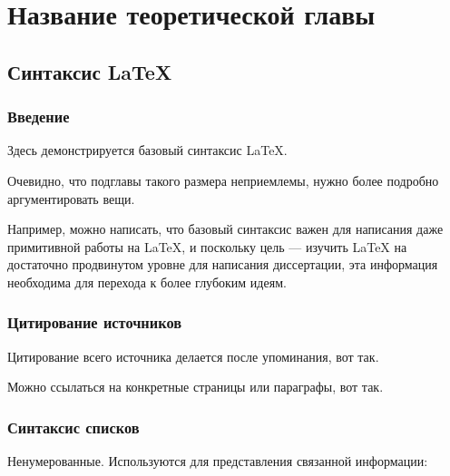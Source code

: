 \documentclass[a4paper,12pt]{report}
\begin{document}
\chapter{Название теоретической главы}\label{intro_chapter_title}

\section{Синтаксис \LaTeX{}}

\subsection{Введение}

Здесь демонстрируется базовый синтаксис \LaTeX{}.

Очевидно, что подглавы такого размера неприемлемы,
нужно более подробно аргументировать вещи.

Например, можно написать, что базовый синтаксис важен
для написания даже примитивной работы на \LaTeX{}, и поскольку
цель — изучить \LaTeX{} на достаточно продвинутом уровне для написания
диссертации, эта информация необходима для перехода к более глубоким идеям.

\subsection{Цитирование источников}

Цитирование всего источника делается после упоминания, вот так\cite{gif_unusable_reason}.

Можно ссылаться на конкретные страницы или параграфы, вот так\cite[12.2.]{png_spec}.

\subsection{Синтаксис списков}

Ненумерованные. Используются для представления связанной информации:
\end{document}
